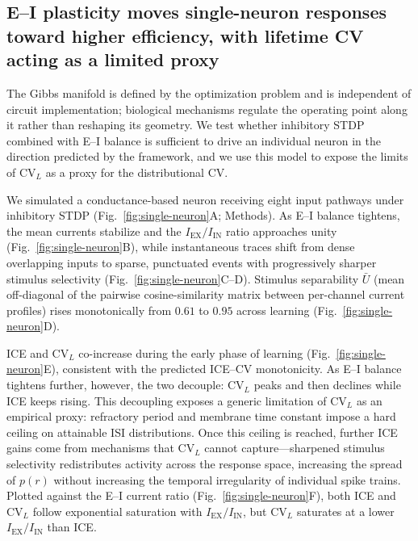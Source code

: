 \subsection{E--I plasticity moves single-neuron responses toward higher efficiency, with lifetime CV acting as a limited proxy}
\label{sec:single_neuron_ice}

The Gibbs manifold is defined by the optimization problem and is independent of circuit implementation; biological mechanisms regulate the operating point along it rather than reshaping its geometry.  We test whether inhibitory STDP combined with E--I balance is sufficient to drive an individual neuron in the direction predicted by the framework, and we use this model to expose the limits of $\mathrm{CV}_L$ as a proxy for the distributional CV.

We simulated a conductance-based neuron receiving eight input pathways under inhibitory STDP \cite{16,sp_stdp} (Fig.~\ref{fig:single-neuron}A; Methods).  As E--I balance tightens, the mean currents stabilize and the $I_\mathrm{EX}/I_\mathrm{IN}$ ratio approaches unity (Fig.~\ref{fig:single-neuron}B), while instantaneous traces shift from dense overlapping inputs to sparse, punctuated events with progressively sharper stimulus selectivity (Fig.~\ref{fig:single-neuron}C--D).  Stimulus separability $\bar{U}$ (mean off-diagonal of the pairwise cosine-similarity matrix between per-channel current profiles) rises monotonically from $0.61$ to $0.95$ across learning (Fig.~\ref{fig:single-neuron}D).

ICE and $\mathrm{CV}_L$ co-increase during the early phase of learning (Fig.~\ref{fig:single-neuron}E), consistent with the predicted ICE--CV monotonicity.  As E--I balance tightens further, however, the two decouple: $\mathrm{CV}_L$ peaks and then declines while ICE keeps rising.  This decoupling exposes a generic limitation of $\mathrm{CV}_L$ as an empirical proxy: refractory period and membrane time constant impose a hard ceiling on attainable ISI distributions.  Once this ceiling is reached, further ICE gains come from mechanisms that $\mathrm{CV}_L$ cannot capture---sharpened stimulus selectivity redistributes activity across the response space, increasing the spread of $p(r)$ without increasing the temporal irregularity of individual spike trains.  Plotted against the E--I current ratio (Fig.~\ref{fig:single-neuron}F), both ICE and $\mathrm{CV}_L$ follow exponential saturation with $I_\mathrm{EX}/I_\mathrm{IN}$, but $\mathrm{CV}_L$ saturates at a lower $I_\mathrm{EX}/I_\mathrm{IN}$ than ICE.

